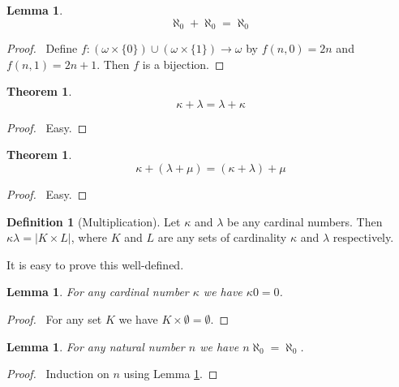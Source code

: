 \documentclass{article}
\let\qed\relax
\newtheorem{lemma}[axiom]{Lemma}
\newtheorem{theorem}[axiom]{Theorem}
\theoremstyle{definition}
\newtheorem{definition}[axiom]{Definition}
\begin{document}
    \begin{lemma}
        \label{lemma:aleph0_plus_aleph0}
        \[ \aleph_0 + \aleph_0 = \aleph_0 \]
    \end{lemma}

    \begin{proof}
        \pf\ Define $f : (\omega \times \{ 0 \}) \cup (\omega \times \{1\}) \rightarrow \omega$ by
        $f(n,0) = 2n$ and $f(n,1) = 2n+1$. Then $f$ is a bijection. \qed
    \end{proof}

    \begin{theorem}
        \[ \kappa + \lambda = \lambda + \kappa \]
    \end{theorem}

    \begin{proof}
        \pf\ Easy. \qed
    \end{proof}

    \begin{theorem}
        \[ \kappa + (\lambda + \mu) = (\kappa + \lambda) + \mu \]
    \end{theorem}

    \begin{proof}
        \pf\ Easy. \qed
    \end{proof}

    \begin{definition}[Multiplication]
        Let $\kappa$ and $\lambda$ be any cardinal numbers. Then $\kappa \lambda = |K \times L|$,
        where $K$ and $L$ are any sets of cardinality $\kappa$ and $\lambda$ respectively.
    \end{definition}

    It is easy to prove this well-defined.

    \begin{lemma}
        For any cardinal number $\kappa$ we have $\kappa 0 = 0$.
    \end{lemma}

    \begin{proof}
        \pf\ For any set $K$ we have $K \times \emptyset = \emptyset$. \qed
    \end{proof}

    \begin{lemma}
        For any natural number $n$ we have $n \aleph_0 = \aleph_0$.
    \end{lemma}

    \begin{proof}
        \pf\ Induction on $n$ using Lemma \ref{lemma:aleph0_plus_aleph0}. \qed
    \end{proof}
\end{document}
